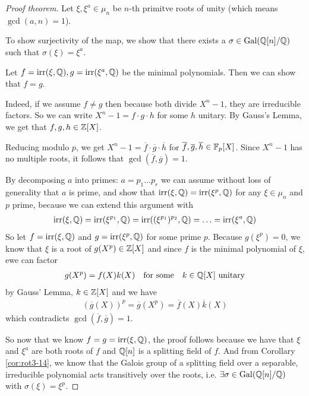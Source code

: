 \begin{proof}[Proof theorem]
  Let $\xi,\xi^{a} \in \mu_n$ be $n$-th primitve roots of unity (which means $\gcd(a,n) = 1$).

  To show surjectivity of the map, we show that there exists a $\sigma \in \operatorname{Gal}(\mathbb{Q}[n]/\mathbb{Q})$ such that $\sigma(\xi) = \xi^{a}$.

  Let $f = \text{irr}(\xi,\mathbb{Q}),g = \text{irr}(\xi^{a},\mathbb{Q})$ be the minimal polynomials. Then we can show that $f=g$.

  Indeed, if we assume $f \neq g$ then because both divide $X^{n} -1$, they are irreducible factors.
  So we can write $X^{n}-1 = f \cdot g \cdot h$ for some $h$ unitary.
  By Gauss's Lemma, we get that $f,g,h \in \mathbb{Z}[X]$.

  Reducing modulo $p$, we get $X^{n}-1 = \overline{f} \cdot \overline{g} \cdot \overline{h}$ for $\overline{f},\overline{g},\overline{h}\in \mathbb{F}_p[X]$.
  Since $X^{n}-1$ has no multiple roots, it follows that $\gcd(\overline{f},\overline{g})=1$.

  By decomposing $a$ into primes: $a = p_1 \dots p_r$ we can assume without loss of generality that $a$ is prime, and show that $\text{irr}(\xi,\mathbb{Q}) = \text{irr}(\xi^{p},\mathbb{Q})$ for any $\xi \in \mu_n$ and $p$ prime, because we can extend this argument with
  \begin{align*}
    \text{irr}(\xi,\mathbb{Q}) = \text{irr}(\xi^{p_1},\mathbb{Q}) = \text{irr}((\xi^{p_1})^{p_2},\mathbb{Q}) = \ldots = \text{irr}(\xi^{a},\mathbb{Q})
  \end{align*}
  So let $f = \text{irr}(\xi,\mathbb{Q})$ and $g = \text{irr}(\xi^{p},\mathbb{Q})$ for some prime $p$.
  Because $g(\xi^{p}) = 0$, we know that $\xi$ is a root of $g(X^{p}) \in \mathbb{Z}[X]$ and since $f$ is the minimal polynomial of $\xi$, ewe can factor
  \begin{align*}
    g(X^{p}) = f(X) k(X) \quad \text{for some} \quad k \in \mathbb{Q}[X] \text{ unitary}
  \end{align*}
  by Gauss' Lemma, $k \in \mathbb{Z}[X]$ and we have
  \begin{align*}
    \left(
      \overline{g}(X)
    \right)^{p} = \overline{g}(X^{p}) = \overline{f}(X) \overline{k}(X)
  \end{align*}
  which contradicts $\gcd(\overline{f},\overline{g}) = 1$.

  So now that we know $f = g = \text{irr}(\xi,\mathbb{Q})$, the proof follows because we have that $\xi$ and $\xi^{a}$ are both roots of $f$ and $\mathbb{Q}[n]$ is a splitting field of $f$.
  And from Corollary \ref{cor:rot3-14}, we know that the Galois group of a splitting field over a separable, irreducible polynomial acts transitively over the roots, i.e. $\exists \sigma \in \operatorname{Gal}(\mathbb{Q}[n]/\mathbb{Q})$ with $\sigma(\xi) = \xi^{p}$.
\end{proof}

